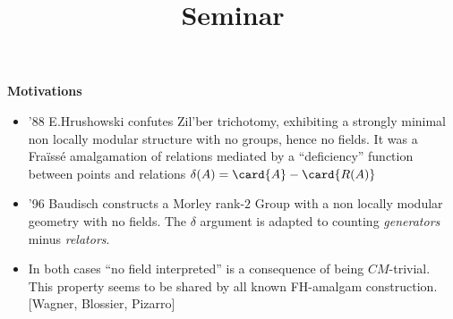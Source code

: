 \documentclass[a4paper,11pt,german,english]{report}
\title{Seminar}
\begin{document}
{\bf Motivations}
\begin{itemize}
\item[] '88 E.Hrushowski confutes Zil'ber trichotomy, exhibiting a strongly minimal
non locally modular structure with no groups, hence no fields. It was a Fra\"iss\'e amalgamation of relations mediated by a ``deficiency'' function between points and relations
$\delta(A)=\card{A}-\card{R(A)}$
\item[]'96 Baudisch constructs a Morley rank-$2$ Group with a non locally modular geometry with no fields. The $\delta$ argument is adapted to counting {\em generators} minus {\em relators}.
\item[]In both cases ``no field interpreted'' is a consequence of being $CM$-trivial. This property seems to be shared by all known FH-amalgam construction. [Wagner, Blossier, Pizarro]
\end{itemize}
\end{document}
